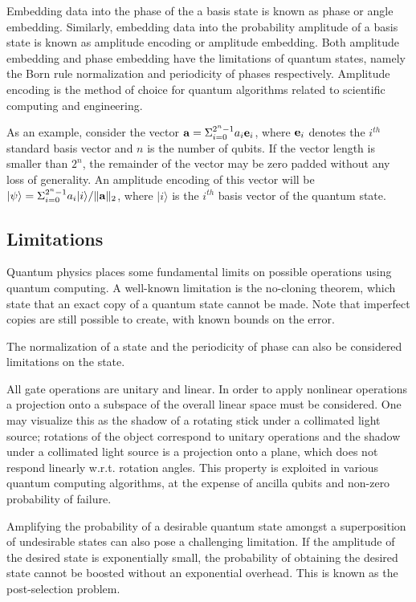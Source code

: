\documentclass{article}
\begin{document}
Embedding data into the phase of the a basis state is known as phase or angle embedding. Similarly, embedding data into the probability amplitude of a basis state is known as amplitude encoding or amplitude embedding. Both amplitude embedding and phase embedding have the limitations of quantum states, namely the Born rule normalization and periodicity of phases respectively. Amplitude encoding is the method of choice for quantum algorithms related to scientific computing and engineering.

As an example, consider the vector $\bold{a} = \Sigma_{i=0}^{2^n-1 }a_i \bold{e}_i$, where $\bold{e}_i$ denotes the $i^{th}$ standard basis vector and $n$ is the number of qubits. If the vector length is smaller than $2^n$, the remainder of the vector may be zero padded without any loss of generality. An amplitude encoding of this vector will be $\lvert \psi \rangle = \Sigma_{i=0}^{2^n-1} a_i \lvert i \rangle / \lVert \bold{a} \rVert_2 $, where $\lvert i \rangle$ is the $i^{th}$ basis vector of the quantum state.

\subsection{Limitations}

Quantum physics places some fundamental limits on possible operations using quantum computing. A well-known limitation is the no-cloning theorem, which state that an exact copy of a quantum state cannot be made. Note that imperfect copies are still possible to create, with known bounds on the error.

The normalization of a state and the periodicity of phase can also be considered limitations on the state.

All gate operations are unitary and linear. In order to apply nonlinear operations a projection onto a subspace of the overall linear space must be considered. One may visualize this as the shadow of a rotating stick under a collimated light source; rotations of the object correspond to unitary operations and the shadow under a collimated light source is a projection onto a plane, which does not respond linearly w.r.t. rotation angles. This property is exploited in various quantum computing algorithms, at the expense of ancilla qubits and non-zero probability of failure.

Amplifying the probability of a desirable quantum state amongst a superposition of undesirable states can also pose a challenging limitation. If the amplitude of the desired state is exponentially small, the probability of obtaining the desired state cannot be boosted without an exponential overhead. This is known as the post-selection problem.
\end{document}

